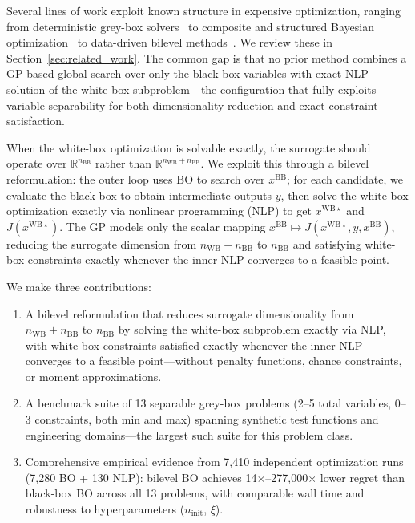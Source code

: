 \documentclass[12pt,a4paper]{article}%
\theoremstyle{plain}%
\theoremstyle{remark}%
\theoremstyle{definition}%
\def\WB{\mathrm{WB}}
\def\BB{\mathrm{BB}}
\begin{document}
Several lines of work exploit known structure in expensive optimization, ranging from deterministic grey-box solvers~\cite{boukouvala2017greybox_jgo,boukouvala2017argonaut,eason2016trf} to composite and structured Bayesian optimization~\cite{astudillo2019bocf,paulson2022cobalt,kudva2026bonsai} to data-driven bilevel methods~\cite{beykal2020domino,kieffer2017bilevel}. We review these in Section~\ref{sec:related_work}. The common gap is that no prior method combines a GP-based global search over only the black-box variables with exact NLP solution of the white-box subproblem---the configuration that fully exploits variable separability for both dimensionality reduction and exact constraint satisfaction.

When the white-box optimization is solvable exactly, the surrogate should operate over $\mathbb{R}^{n_{\BB}}$ rather than $\mathbb{R}^{n_{\WB}+n_{\BB}}$. We exploit this through a bilevel reformulation: the outer loop uses BO to search over $x^{\BB}$; for each candidate, we evaluate the black box to obtain intermediate outputs $y$, then solve the white-box optimization exactly via nonlinear programming (NLP) to get $x^{\WB\star}$ and $J(x^{\WB\star})$. The GP models only the scalar mapping $x^{\BB} \mapsto J(x^{\WB\star}, y, x^{\BB})$, reducing the surrogate dimension from $n_{\WB}+n_{\BB}$ to $n_{\BB}$ and satisfying white-box constraints exactly whenever the inner NLP converges to a feasible point.

We make three contributions:
\begin{enumerate}
    \item A bilevel reformulation that reduces surrogate dimensionality from $n_{\WB}+n_{\BB}$ to $n_{\BB}$ by solving the white-box subproblem exactly via NLP, with white-box constraints satisfied exactly whenever the inner NLP converges to a feasible point---without penalty functions, chance constraints, or moment approximations.
    \item A benchmark suite of 13 separable grey-box problems (2--5 total variables, 0--3 constraints, both min and max) spanning synthetic test functions and engineering domains---the largest such suite for this problem class.
    \item Comprehensive empirical evidence from 7{,}410 independent optimization runs (7{,}280 BO + 130 NLP): bilevel BO achieves 14$\times$--277{,}000$\times$ lower regret than black-box BO across all 13 problems, with comparable wall time and robustness to hyperparameters ($n_\text{init}$, $\xi$).
\end{enumerate}
\end{document}
